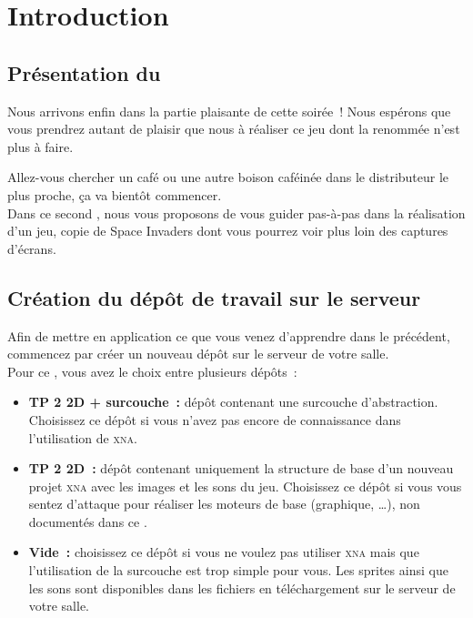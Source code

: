 \chapter{Introduction}

\section{Présentation du \tp}

Nous arrivons enfin dans la partie plaisante de cette soirée~! Nous espérons que vous prendrez autant de plaisir que nous à réaliser ce jeu dont la renommée n'est plus à faire.

Allez-vous chercher un café ou une autre boison caféinée dans le distributeur le plus proche, ça va bientôt commencer.\\

Dans ce second \tp, nous vous proposons de vous guider pas-à-pas dans la réalisation d'un jeu, copie de Space Invaders dont vous pourrez voir plus loin des captures d'écrans.

\section{Création du dépôt de travail sur le serveur \svn}

Afin de mettre en application ce que vous venez d'apprendre dans le \tp{} précédent, commencez par créer un nouveau dépôt sur le serveur de votre salle.\\

Pour ce \tp, vous avez le choix entre plusieurs dépôts~:
\begin{itemize}
 \item \textbf{TP 2 2D + surcouche~:} dépôt contenant une surcouche d'abstraction. Choisissez ce dépôt si vous n'avez pas encore de connaissance dans l'utilisation de \textsc{xna}.
 \item \textbf{TP 2 2D~:} dépôt contenant uniquement la structure de base d'un nouveau projet \textsc{xna} avec les images et les sons du jeu. Choisissez ce dépôt si vous vous sentez d'attaque pour réaliser les moteurs de base (graphique, \ldots), non documentés dans ce \tp.
 \item \textbf{Vide~:} choisissez ce dépôt si vous ne voulez pas utiliser \textsc{xna} mais que l'utilisation de la surcouche est trop simple pour vous. Les sprites ainsi que les sons sont disponibles dans les fichiers en téléchargement sur le serveur de votre salle.
\end{itemize}